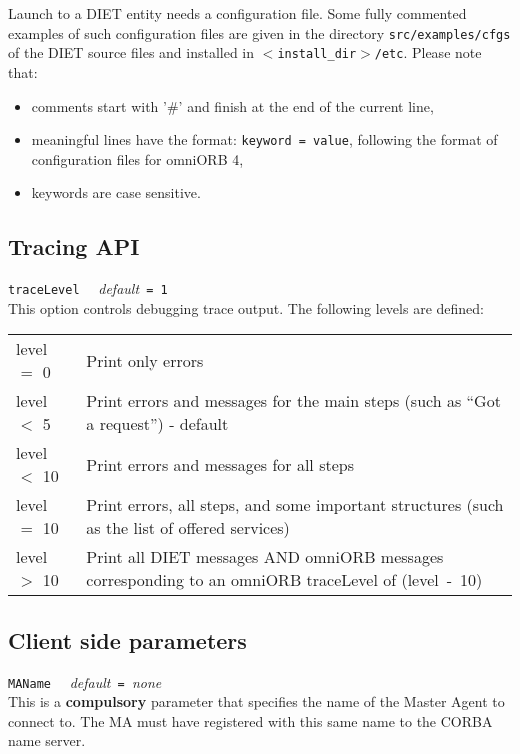Launch to a DIET entity needs a configuration file. Some fully commented
examples of such configuration files are given in the directory
\texttt{src/examples/cfgs} of the DIET source files and installed in
\texttt{$<$install\_dir$>$/etc}. Please note that:
\begin{itemize}
\item comments start with '\#' and finish at the end of the current
  line,
\item meaningful lines have the format: \texttt{keyword = value}, following the
  format of configuration files for omniORB 4,
\item keywords are case sensitive.
\end{itemize}

\subsection{Tracing API}

\noindent
\texttt{traceLevel} \ \ \emph{default}\texttt{ = 1}\\
This option controls debugging trace output. The following levels are defined:

\begin{center}
 \footnotesize
 \begin{tabular}{p{.1\linewidth}p{.8\linewidth}}
  level $=$ 0  & Print only errors\\
  level $<$ 5  & Print errors and messages for the main steps (such as ``Got a
  request'') - default\\
  level $<$ 10 & Print errors and messages for all steps\\
  level $=$ 10 & Print errors, all steps, and some important structures (such
  as the list of offered services)\\
  level $>$ 10 & Print all DIET messages AND omniORB messages corresponding to
  an omniORB traceLevel of (level~-~10)
 \end{tabular}
\end{center}


\subsection{Client side parameters}

\noindent
\texttt{MAName} \ \ \emph{default}\texttt{ = }\emph{none}\\
This is a \textbf{compulsory} parameter that specifies the name of the Master
Agent to connect to. The MA must have registered with this same name to the
CORBA name server.


